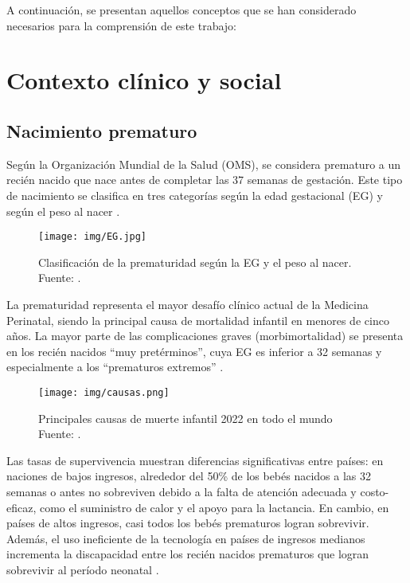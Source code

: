 
A continuación, se presentan aquellos conceptos que se han considerado necesarios para la comprensión de este trabajo:

\section{Contexto clínico y social}

\subsection{Nacimiento prematuro}
Según la Organización Mundial de la Salud (OMS), se considera prematuro a un recién nacido que nace antes de completar las 37 semanas de gestación. Este tipo de nacimiento se clasifica en tres categorías según la edad gestacional (EG) y según el peso al nacer \cite{who2023preterm}.

\begin{figure}[H]
    \centering
    \texttt{[image: img/EG.jpg]}
    \caption{Clasificación de la prematuridad según la EG y el peso al nacer. Fuente: \cite{seneo2023protocolos}.}
    \label{fig:clasificación}
\end{figure}

La prematuridad representa el mayor desafío clínico actual de la Medicina Perinatal, siendo la principal causa de mortalidad infantil en menores de cinco años. La mayor parte de las complicaciones graves (morbimortalidad) se presenta en los recién nacidos “muy pretérminos”, cuya EG es inferior a 32 semanas y especialmente a los “prematuros extremos” \cite{rellan2008prematuro}.

\begin{figure}[H]
    \centering
    \texttt{[image: img/causas.png]}
    \caption{Principales causas de muerte infantil 2022 en todo el mundo 
    \\Fuente: \cite{hnn2024comprender}.}
    \label{fig:causas}
\end{figure}


Las tasas de supervivencia muestran diferencias significativas entre países: en naciones de bajos ingresos, alrededor del 50\% de los bebés nacidos a las 32 semanas o antes no sobreviven debido a la falta de atención adecuada y costo-eficaz, como el suministro de calor y el apoyo para la lactancia. En cambio, en países de altos ingresos, casi todos los bebés prematuros logran sobrevivir. Además, el uso ineficiente de la tecnología en países de ingresos medianos incrementa la discapacidad entre los recién nacidos prematuros que logran sobrevivir al período neonatal \cite{rios2017influencia}.

